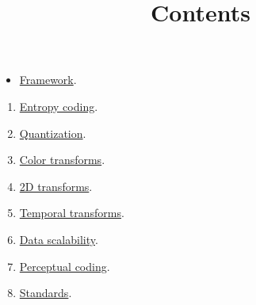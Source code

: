 

\title{\SM{} \newline Contents}

\maketitle

\begin{itemize}
\item \href{https://sistemas-multimedia.github.io/study_guide/contents//framework}{Framework}.
\end{itemize}
\begin{enumerate}
\item \href{https://sistemas-multimedia.github.io/study_guide/contents/entropy_coding}{Entropy coding}.
\item \href{https://sistemas-multimedia.github.io/study_guide/contents/quantization}{Quantization}.
\item \href{https://sistemas-multimedia.github.io/study_guide/contents/color_transforms}{Color transforms}.
\item \href{https://sistemas-multimedia.github.io/study_guide/contents/spatial_transforms}{2D transforms}.
\item \href{https://sistemas-multimedia.github.io/study_guide/contents/temporal_transforms}{Temporal transforms}.
\item \href{https://sistemas-multimedia.github.io/study_guide/contents/data_scalability}{Data scalability}.
\item \href{https://sistemas-multimedia.github.io/study_guide/contents/perceptual_coding}{Perceptual coding}.
\item \href{https://sistemas-multimedia.github.io/study_guide/contents/standards}{Standards}.
\end{enumerate}

